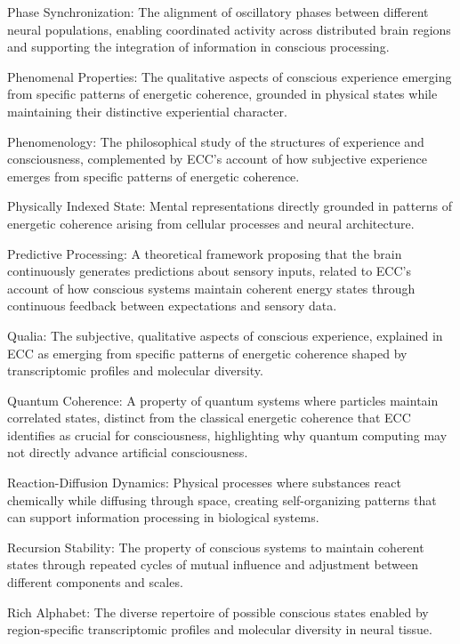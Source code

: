 Phase Synchronization: The alignment of oscillatory phases between different neural populations, enabling coordinated activity across distributed brain regions and supporting the integration of information in conscious processing.

Phenomenal Properties: The qualitative aspects of conscious experience emerging from specific patterns of energetic coherence, grounded in physical states while maintaining their distinctive experiential character.

Phenomenology: The philosophical study of the structures of experience and consciousness, complemented by ECC's account of how subjective experience emerges from specific patterns of energetic coherence.

Physically Indexed State: Mental representations directly grounded in patterns of energetic coherence arising from cellular processes and neural architecture.

Predictive Processing: A theoretical framework proposing that the brain continuously generates predictions about sensory inputs, related to ECC's account of how conscious systems maintain coherent energy states through continuous feedback between expectations and sensory data.

Qualia: The subjective, qualitative aspects of conscious experience, explained in ECC as emerging from specific patterns of energetic coherence shaped by transcriptomic profiles and molecular diversity.

Quantum Coherence: A property of quantum systems where particles maintain correlated states, distinct from the classical energetic coherence that ECC identifies as crucial for consciousness, highlighting why quantum computing may not directly advance artificial consciousness.

Reaction-Diffusion Dynamics: Physical processes where substances react chemically while diffusing through space, creating self-organizing patterns that can support information processing in biological systems.

Recursion Stability: The property of conscious systems to maintain coherent states through repeated cycles of mutual influence and adjustment between different components and scales.

Rich Alphabet: The diverse repertoire of possible conscious states enabled by region-specific transcriptomic profiles and molecular diversity in neural tissue.

